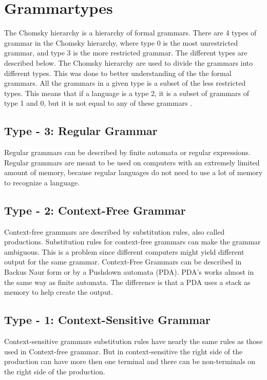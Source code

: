 \section{Grammartypes}
The Chomsky hierarchy is a hierarchy of formal grammars. There are 4 types of grammar in the Chomsky hierarchy, where type 0 is the most unrestricted grammar, and type 3 is the more restricted grammar. The different types are described below. The Chomsky hierarchy are used to divide the grammars into different types. This was done to better understanding of the the formal grammars. All the grammars in a given type is a subset of the less restricted types. This means that if a language is a type 2, it is a subset of grammars of type 1 and 0, but it is not equal to any of these grammars \citep{Chomsky}.

\subsection{Type - 3: Regular Grammar}
Regular grammars can be described by finite automata or regular expressions. Regular grammars are meant to be used on computers with an extremely limited amount of memory, because regular languages do not need to use a lot of memory to recognize a language\citep{sipser}.

\subsection{Type - 2: Context-Free Grammar}
Context-free grammars are described by substitution rules, also called productions. Substitution rules for context-free grammars can make the grammar ambiguous.
This is a problem since different computers might yield different output for the same grammar.
Context-Free Grammars can be described in Backus Naur form or by a Pushdown automata (PDA). PDA's works almost in the same way as finite automata. The difference is that a PDA uses a stack as memory to help create the output\citep{sipser}. 

\subsection{Type - 1: Context-Sensitive Grammar}
Context-sensitive grammars substitution rules have nearly the same rules as those used in Context-free grammar. But in context-sensitive the right side of the production can have more then one terminal and there can be non-terminals on the right side of the production. 

